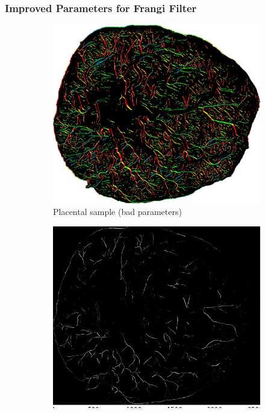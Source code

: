 \documentclass[9pt,notes]{beamer}
\begin{document}
\begin{frame}
	\frametitle{Improved Parameters for Frangi Filter}
	\begin{figure}
		\begin{subfigure}[t]{0.33\textwidth}
			\includegraphics[width=\textwidth]{04-raw.png}
			\caption{Placental sample (bad parameters)}
		\end{subfigure}
		\begin{subfigure}[t]{0.33\textwidth}
			\includegraphics[width=\textwidth]{04-improved.png}

\end{subfigure}
\end{figure}
\end{frame}
\end{document}
